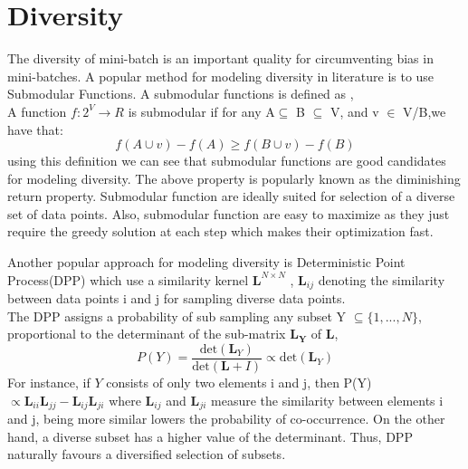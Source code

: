 \documentclass[a4paper,twoside]{iiththesis}
\theoremstyle{definition}
\theoremstyle{definition}
\theoremstyle{remark}
\begin{document}
\section{Diversity}
The diversity of mini-batch is an important quality for circumventing bias in mini-batches. A popular method for modeling diversity in literature is to use Submodular Functions. A submodular functions is defined as ,\\
A function $f:2^V\longrightarrow R$ is submodular if for any A$\subseteq$ B $\subseteq$ V, and v $\in$ V/B,we have that:
    \begin{equation*}
        f(A\cup v) - f(A)\geq f(B\cup v)- f(B)    
    \end{equation*}
using this definition we can  see that submodular functions  are good candidates for modeling diversity. The above property is popularly known as the diminishing return property. Submodular function are ideally suited for selection of a diverse set of data points. Also, submodular function are easy to maximize as they just require the greedy solution at each step which makes their optimization fast. 

Another  popular approach for modeling diversity is Deterministic Point Process(DPP) which use a similarity kernel $\mathbf{L}^{N \times N}$ , $\mathbf{L}_{ij}$ denoting the similarity between data points i and j for sampling diverse data points. \\
The DPP assigns a probability of sub sampling any subset Y $\subseteq \{1,...,N\}$, proportional to the determinant of the sub-matrix $\mathbf{L_Y}$ of   $\mathbf{L}$, 
\begin{equation} \label{dpp_eq}
P(Y) = \frac{\text{det}(\mathbf{L}_Y )} { \text{det}(\mathbf{L}+I)} \propto \text{det}(\mathbf{L}_Y)
\end{equation}
For instance, if $Y$ consists of only two elements i and j,
then P(Y) $\propto \mathbf{L}_{ii} \mathbf{L}_{jj} - \mathbf{L}_{ij}\mathbf{L}_{ji}$ where $\mathbf{L}_{ij}$ and $\mathbf{L}_{ji}$ measure the similarity between elements i and j, being more similar lowers the probability of co-occurrence. On the other hand, a diverse subset has a higher value of the determinant. Thus, DPP naturally favours a diversified selection of subsets. \\
\end{document}
